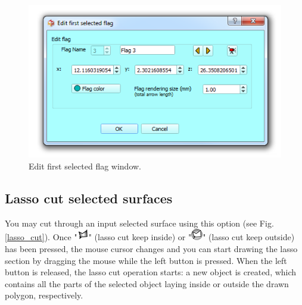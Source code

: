 \begin{figure}
  \centering
  \includegraphics[scale=0.55]{images/06/objects/edit_flag.png} 
	\caption{Edit first selected flag window.}
\label{landmark_edit}
 
\end{figure}
\subsection{Lasso cut selected surfaces} \label{lasso_cut_section}

You may cut through an input selected surface using this option (see Fig. \ref{lasso_cut}). Once "\includegraphics[scale=0.7]{images/06/objects/lasso_keepinside.png}" (lasso cut keep inside) or "\includegraphics[scale=0.7]{images/06/objects/lasso_keepoutside.png}" (lasso cut keep outside) has been pressed, the mouse cursor changes and you can start drawing the lasso section by dragging the mouse while the left button is pressed. When the left button is released, the lasso cut operation starts: a new object is created, which contains all the parts of the selected object laying inside or outside the drawn polygon, respectively.\\


